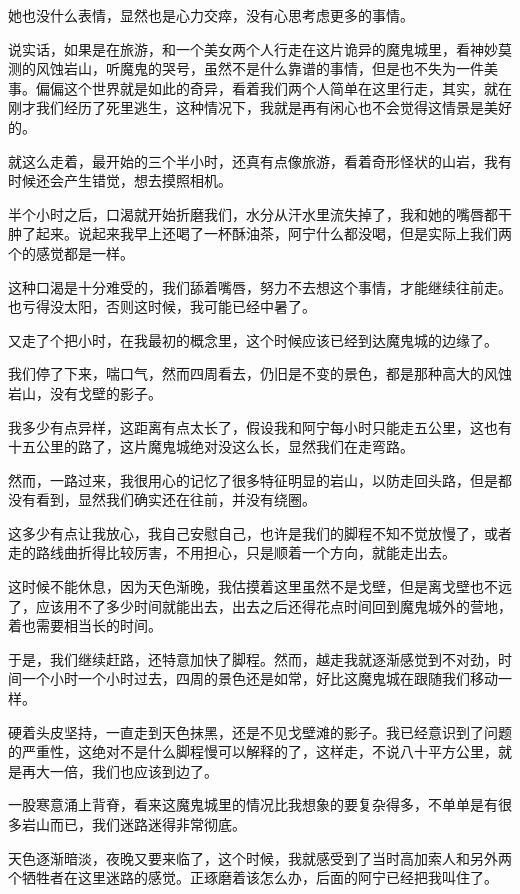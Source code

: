 她也没什么表情，显然也是心力交瘁，没有心思考虑更多的事情。

说实话，如果是在旅游，和一个美女两个人行走在这片诡异的魔鬼城里，看神妙莫测的风蚀岩山，听魔鬼的哭号，虽然不是什么靠谱的事情，但是也不失为一件美事。偏偏这个世界就是如此的奇异，看着我们两个人简单在这里行走，其实，就在刚才我们经历了死里逃生，这种情况下，我就是再有闲心也不会觉得这情景是美好的。

就这么走着，最开始的三个半小时，还真有点像旅游，看着奇形怪状的山岩，我有时候还会产生错觉，想去摸照相机。

半个小时之后，口渴就开始折磨我们，水分从汗水里流失掉了，我和她的嘴唇都干肿了起来。说起来我早上还喝了一杯酥油茶，阿宁什么都没喝，但是实际上我们两个的感觉都是一样。

这种口渴是十分难受的，我们舔着嘴唇，努力不去想这个事情，才能继续往前走。也亏得没太阳，否则这时候，我可能已经中暑了。

又走了个把小时，在我最初的概念里，这个时候应该已经到达魔鬼城的边缘了。

我们停了下来，喘口气，然而四周看去，仍旧是不变的景色，都是那种高大的风蚀岩山，没有戈壁的影子。

我多少有点异样，这距离有点太长了，假设我和阿宁每小时只能走五公里，这也有十五公里的路了，这片魔鬼城绝对没这么长，显然我们在走弯路。

然而，一路过来，我很用心的记忆了很多特征明显的岩山，以防走回头路，但是都没有看到，显然我们确实还在往前，并没有绕圈。

这多少有点让我放心，我自己安慰自己，也许是我们的脚程不知不觉放慢了，或者走的路线曲折得比较厉害，不用担心，只是顺着一个方向，就能走出去。

这时候不能休息，因为天色渐晚，我估摸着这里虽然不是戈壁，但是离戈壁也不远了，应该用不了多少时间就能出去，出去之后还得花点时间回到魔鬼城外的营地，着也需要相当长的时间。

于是，我们继续赶路，还特意加快了脚程。然而，越走我就逐渐感觉到不对劲，时间一个小时一个小时过去，四周的景色还是如常，好比这魔鬼城在跟随我们移动一样。

硬着头皮坚持，一直走到天色抹黑，还是不见戈壁滩的影子。我已经意识到了问题的严重性，这绝对不是什么脚程慢可以解释的了，这样走，不说八十平方公里，就是再大一倍，我们也应该到边了。

一股寒意涌上背脊，看来这魔鬼城里的情况比我想象的要复杂得多，不单单是有很多岩山而已，我们迷路迷得非常彻底。

天色逐渐暗淡，夜晚又要来临了，这个时候，我就感受到了当时高加索人和另外两个牺牲者在这里迷路的感觉。正琢磨着该怎么办，后面的阿宁已经把我叫住了。

